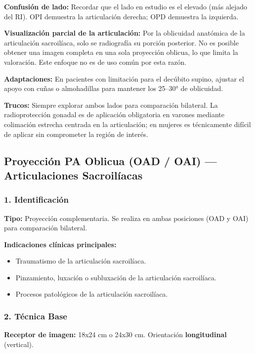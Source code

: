 		\textbf{Confusión de lado:} Recordar que el lado en estudio es el elevado (más alejado del RI). OPI demuestra la articulación derecha; OPD demuestra la izquierda.
		
		\textbf{Visualización parcial de la articulación:} Por la oblicuidad anatómica de la articulación sacroilíaca, solo se radiografía su porción posterior. No es posible obtener una imagen completa en una sola proyección oblicua, lo que limita la valoración. Este enfoque no es de uso común por esta razón.
		
		\textbf{Adaptaciones:} En pacientes con limitación para el decúbito supino, ajustar el apoyo con cuñas o almohadillas para mantener los 25--30° de oblicuidad.
		
		\textbf{Trucos:} Siempre explorar ambos lados para comparación bilateral. La radioprotección gonadal es de aplicación obligatoria en varones mediante colimación estrecha centrada en la articulación; en mujeres es técnicamente difícil de aplicar sin comprometer la región de interés.
		
		\subsection{Proyección PA Oblicua (OAD / OAI) --- Articulaciones Sacroilíacas}
		
		\subsubsection*{1. Identificación}
		
		\textbf{Tipo:} Proyección complementaria. Se realiza en ambas posiciones (OAD y OAI) para comparación bilateral.
		
		\textbf{Indicaciones clínicas principales:}
		\begin{itemize}
			\item Traumatismo de la articulación sacroilíaca.
			\item Pinzamiento, luxación o subluxación de la articulación sacroilíaca.
			\item Procesos patológicos de la articulación sacroilíaca.
		\end{itemize}
		
		\subsubsection*{2. Técnica Base}
		
		\textbf{Receptor de imagen:} 18x24 cm o 24x30 cm. Orientación \textbf{longitudinal} (vertical).
		
